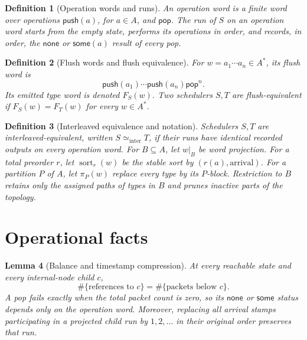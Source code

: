 \documentclass[11pt]{article}
\newtheorem{definition}{Definition}
\newtheorem{lemma}[definition]{Lemma}
\begin{document}
\begin{definition}[Operation words and runs]
An \emph{operation word} is a finite word over operations $\mathsf{push}(a)$, for $a\in A$, and $\mathsf{pop}$.  The \emph{run} of $S$ on an operation word starts from the empty state, performs its operations in order, and records, in order, the $\mathsf{none}$ or $\mathsf{some}(a)$ result of every pop.
\end{definition}

\begin{definition}[Flush words and flush equivalence]
For $w=a_1\cdots a_n\in A^*$, its \emph{flush word} is
\[
\mathsf{push}(a_1)\cdots\mathsf{push}(a_n)\mathsf{pop}^n.
\]
Its emitted type word is denoted $F_S(w)$.  Two schedulers $S,T$ are \emph{flush-equivalent} if $F_S(w)=F_T(w)$ for every $w\in A^*$.
\end{definition}

\begin{definition}[Interleaved equivalence and notation]
Schedulers $S,T$ are \emph{interleaved-equivalent}, written $S\simeq_{\mathrm{inter}}T$, if their runs have identical recorded outputs on every operation word.  For $B\subseteq A$, let $w|_B$ be word projection.  For a total preorder $r$, let $\operatorname{sort}_r(w)$ be the stable sort by $(r(a),\text{arrival})$.  For a partition $P$ of $A$, let $\pi_P(w)$ replace every type by its $P$-block.  Restriction to $B$ retains only the assigned paths of types in $B$ and prunes inactive parts of the topology.
\end{definition}

\section{Operational facts}

\begin{lemma}[Balance and timestamp compression]
At every reachable state and every internal-node child $c$,
\begin{equation}
\#\{\text{references to }c\}
=
\#\{\text{packets below }c\}.
\tag{1}
\end{equation}
A pop fails exactly when the total packet count is zero, so its $\mathsf{none}$ or $\mathsf{some}$ status depends only on the operation word.  Moreover, replacing all arrival stamps participating in a projected child run by $1,2,\ldots$ in their original order preserves that run.
\end{lemma}
\end{document}
